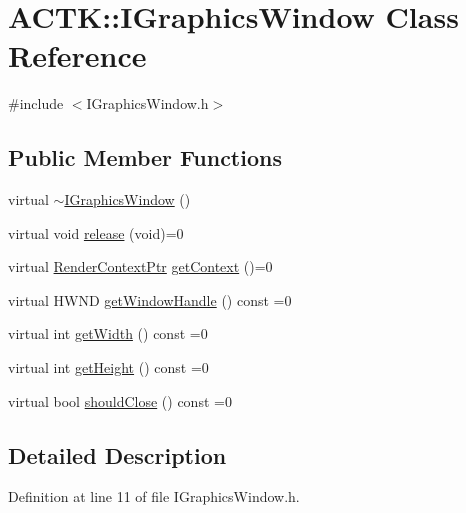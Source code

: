 \hypertarget{class_a_c_t_k_1_1_i_graphics_window}{\section{A\-C\-T\-K\-:\-:I\-Graphics\-Window Class Reference}
\label{class_a_c_t_k_1_1_i_graphics_window}
}


{\ttfamily \#include $<$I\-Graphics\-Window.\-h$>$}

\subsection*{Public Member Functions}
\begin{DoxyCompactItemize}
\item 
virtual \hyperlink{class_a_c_t_k_1_1_i_graphics_window_a16812af5e719efc5a575b0283f4bdc66}{$\sim$\-I\-Graphics\-Window} ()
\item 
virtual void \hyperlink{class_a_c_t_k_1_1_i_graphics_window_aa092cd1f6534d0d23c4a2e3febf5494a}{release} (void)=0
\item 
virtual \hyperlink{namespace_a_c_t_k_a7030f603b6015e2f7c08ab1cc584d084}{Render\-Context\-Ptr} \hyperlink{class_a_c_t_k_1_1_i_graphics_window_af06c90cd665b66f919e55e16a80727ce}{get\-Context} ()=0
\item 
virtual H\-W\-N\-D \hyperlink{class_a_c_t_k_1_1_i_graphics_window_a2c674c5e71ab10cb13e3f5ca986b6f7f}{get\-Window\-Handle} () const =0
\item 
virtual int \hyperlink{class_a_c_t_k_1_1_i_graphics_window_a95fbb76b06c5af1895a05fb4182a2ac0}{get\-Width} () const =0
\item 
virtual int \hyperlink{class_a_c_t_k_1_1_i_graphics_window_a3ef887e74b873413a77fd5b7d1389f58}{get\-Height} () const =0
\item 
virtual bool \hyperlink{class_a_c_t_k_1_1_i_graphics_window_aaf2801aeff73496d0ca2152fb1303f8e}{should\-Close} () const =0
\end{DoxyCompactItemize}


\subsection{Detailed Description}


Definition at line 11 of file I\-Graphics\-Window.\-h.



